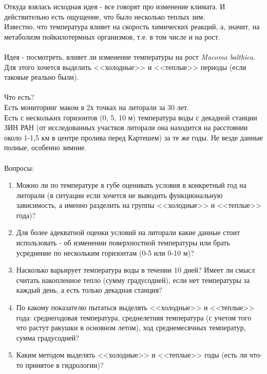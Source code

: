 \documentclass[12pt]{article}
\begin{document}
Откуда взялась исходная идея - все говорят про изменение климата. И действительно есть ощущение, что было несколько теплых зим. \\
Известно, что температура влияет на скорость химических реакций, а, значит, на метаболизм пойкилотермных организмов, т.е. в том числе и на рост. \\
\\

Идея - посмотреть, влияет ли изменение температуры на рост {\it Macoma balthica}. \\
Для этого хочется выделить <<холодные>> и <<теплые>> периоды (если таковые реально были).\\
\\

Что есть?\\
Есть мониторинг маком в 2х точках на литорали за 30 лет.\\
Есть с нескольких горизонтов (0, 5, 10 м) температура воды с декадной станции ЗИН РАН (от исследованных участков литорали она находится на расстоянии около 1-1,5 км в центре пролива перед Картешем) за те же годы. Не везде данные полные, особенно зимние. \\
\\

Вопросы:\\
\begin{enumerate}
\item Можно ли по температуре в губе оценивать условия в конкретный год на литорали (в ситуации если хочется не выводить функциональную зависимость, а именно разделить на группы <<холодные>> и <<теплые>> года)?\\

\item Для более адекватной оценки условий на литорали какие данные стоит использовать - об изменении поверхностной температуры или брать усреднение по нескольким горизонтам (0-5 или 0-10 м)?

\item Насколько варьирует температура воды в течении 10 дней? Имеет ли смысл считать накопленное тепло (сумму градусодней), если нет температуры за каждый день, а есть только декадная станция?

\item По какому показателю пытаться выделять <<холодные>> и <<теплые>> года: среднегодовая температура, среднелетняя температура (с учетом того что растут ракушки в основном летом), ход среднемесячных температур, сумма градусодней?

\item Каким методом выделять <<холодные>> и <<теплые>> годы (есть ли что-то принятое в гидрологии)?
\end{enumerate}
\end{document}
